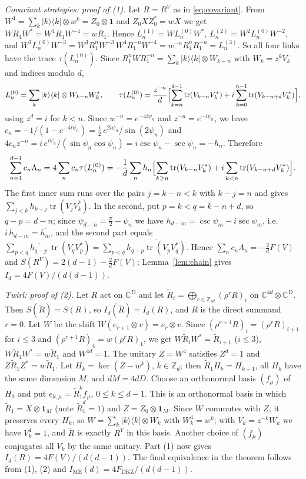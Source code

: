 \documentclass[11pt]{amsart}
\theoremstyle{definition}
\theoremstyle{remark}
\newcommand{\Z}{\mathbb{Z}}
\newcommand{\C}{\mathbb{C}}
\newcommand{\tr}{\operatorname{tr}}
\newcommand{\FD}{F_{\mathrm{DKZ}}}
\newcommand{\IME}{I_{\mathrm{ME}}}
\newcommand{\one}{\mathbf{1}}
\begin{document}
\emph{Covariant strategies: proof of (1).} Let $R=R^V$ as in \eqref{eq:covariant}. From $W^4=\sum_k|k\rangle\langle k|\otimes w^k=Z_0\otimes\one$
and $Z_0XZ_0^*=wX$ we get $WR_4W^*=W^4R_1W^{-4}=wR_1$. Hence $L^{(1)}_n=WL^{(0)}_nW^*$, $L^{(2)}_n=W^2L^{(0)}_nW^{-2}$, and
$W^3L^{(0)}_nW^{-3}=W^3R_1^nW^{-3}\,W^4R_1^{-n}W^{-4}=w^{-n}R_4^nR_1^{-n}=L^{(3)}_n$. So all four links have the trace
$\tau(L^{(0)}_n)$. Since $R_1^nWR_1^{-n}=\sum_k|k\rangle\langle k|\otimes W_{k-n}$ with $W_k=z^kV_k$ and indices modulo $d$,
\[
L^{(0)}_n=\sum_{k}|k\rangle\langle k|\otimes W_{k-n}W_k^*,\qquad
\tau(L^{(0)}_n)=\frac{z^{-n}}d\Bigl[\sum_{k=n}^{d-1}\tr(V_{k-n}V_k^*)+i\sum_{k=0}^{n-1}\tr(V_{k-n+d}V_k^*)\Bigr],
\]
using $z^d=i$ for $k<n$. Since $w^{-n}=e^{-4i\psi_n}$ and $z^{-n}=e^{-i\psi_n}$, we have
$c_n=-1/(1-e^{-4i\psi_n})=\frac i2\,e^{2i\psi_n}/\sin(2\psi_n)$ and
$4c_nz^{-n}=i\,e^{i\psi_n}/(\sin\psi_n\cos\psi_n)=i\csc\psi_n-\sec\psi_n=-h_n$. Therefore
\[
\sum_{n=1}^{d-1}c_n\Lambda_n=4\sum_nc_n\tau(L^{(0)}_n)
=-\frac1d\sum_{n}h_n\Bigl[\sum_{k\ge n}\tr(V_{k-n}V_k^*)+i\sum_{k<n}\tr(V_{k-n+d}V_k^*)\Bigr].
\]
The first inner sum runs over the pairs $j=k-n<k$ with $k-j=n$ and gives $\sum_{j<k}h_{k-j}\tr(V_jV_k^*)$. In the second,
put $p=k<q=k-n+d$, so $q-p=d-n$; since $\psi_{d-n}=\frac\pi2-\psi_n$ we have $h_{d-m}=\csc\psi_m-i\sec\psi_m$, i.e.\
$i\,h_{d-m}=\overline{h_m}$, and the second part equals $\sum_{p<q}\overline{h_{q-p}}\,\tr(V_qV_p^*)
=\sum_{p<q}\overline{h_{q-p}\tr(V_pV_q^*)}$. Hence $\sum_nc_n\Lambda_n=-\frac2dF(V)$ and
$S(R^V)=2(d-1)-\frac2dF(V)$; Lemma~\ref{lem:chain} gives $I_d=4F(V)/(d(d-1))$.

\emph{Twirl: proof of (2).} Let $R$ act on $\C^D$ and let $\widetilde R_i=\bigoplus_{r\in\Z_{4d}}(\rho^rR)_i$ on
$\C^{4d}\otimes\C^D$. Then $S(\widetilde R)=S(R)$, so $I_d(\widetilde R)=I_d(R)$, and $R$ is the direct summand $r=0$.
Let $W$ be the shift $W(e_{r+1}\otimes v)=e_r\otimes v$. Since $(\rho^{r+1}R)_i=(\rho^rR)_{i+1}$ for $i\le3$ and
$(\rho^{r+1}R)_4=w(\rho^rR)_1$, we get $W\widetilde R_iW^*=\widetilde R_{i+1}$ ($i\le3$), $W\widetilde R_4W^*=w\widetilde R_1$ and
$W^{4d}=1$. The unitary $Z=W^4$ satisfies $Z^d=1$ and $Z\widetilde R_1Z^*=w\widetilde R_1$. Let $H_k=\ker(Z-w^k)$,
$k\in\Z_d$; then $\widetilde R_1H_k=H_{k+1}$, all $H_k$ have the same dimension $M$, and $dM=4dD$. Choose an orthonormal
basis $(f_\mu)$ of $H_0$ and put $e_{k,\mu}=\widetilde R_1^kf_\mu$, $0\le k\le d-1$. This is an orthonormal basis in which
$\widetilde R_1=X\otimes\one_M$ (note $\widetilde R_1^d=1$) and $Z=Z_0\otimes\one_M$. Since $W$ commutes with $Z$, it
preserves every $H_k$, so $W=\sum_k|k\rangle\langle k|\otimes W_k$ with $W_k^4=w^k$; with $V_k=z^{-k}W_k$ we have $V_k^4=1$,
and $\widetilde R$ is exactly $R^V$ in this basis. Another choice of $(f_\mu)$ conjugates all $V_k$ by the same unitary.
Part (1) now gives $I_d(R)=4F(V)/(d(d-1))$. The final equivalence in the theorem follows from (1), (2) and
$\IME(d)=4\FD/(d(d-1))$.
\end{document}
